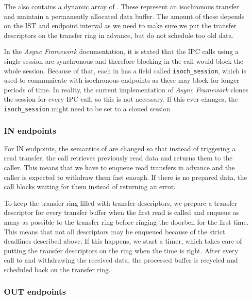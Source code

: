 The  also contains a dynamic array of
. These represent an isochronous transfer and
maintain a permanently allocated data buffer. The amount of these depends on
the IST and endpoint interval as we need to make sure we put the transfer
descriptors on the transfer ring in advance, but do not schedule too old data.

In the \textit{Async Framework} documentation, it is stated that the IPC calls
using a single session are synchronous and therefore blocking in the call would
block the whole session. Because of that, each  in
 has a field called \texttt{isoch\_session}, which is used to
communicate with isochronous endpoints as these may block for longer periods of
time. In reality, the current implementation of \textit{Async Framework} clones
the session for every IPC call, so this is not necessary. If this ever changes,
the \texttt{isoch\_session} might need to be set to a cloned session.

\subsubsection{IN endpoints}

For IN endpoints, the semantics of  are changed so that instead
of triggering a read transfer, the call retrieves previously read data and
returns them to the caller. This means that we have to enqueue read transfers
in advance and the caller is expected to withdraw them fast enough. If there is
no prepared data, the call blocks waiting for them instead of returning an
error.

To keep the transfer ring filled with transfer descriptors, we prepare a
transfer descriptor for every transfer buffer when the first read is called and
enqueue as many as possible to the transfer ring before ringing the doorbell
for the first time. This means that not all descriptors may be enqueued because
of the strict deadlines described above. If this happens, we start a timer,
which takes care of putting the transfer descriptors on the ring when the time
is right. After every call to  and withdrawing the received data,
the processed buffer is recycled and scheduled back on the transfer ring.

\subsubsection{OUT endpoints}

